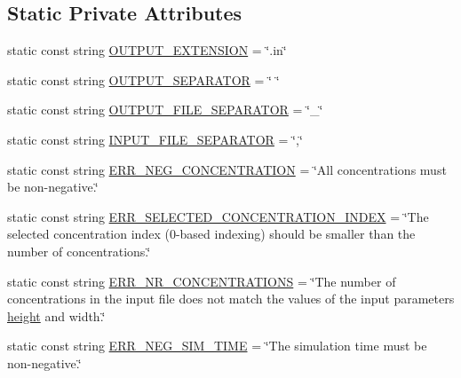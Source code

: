 \subsection*{Static Private Attributes}
\begin{DoxyCompactItemize}
\item 
static const string \hyperlink{classmultiscale_1_1video_1_1RectangularCsvToInputFilesConverter_a4a4df22dde1d303c2be63f6f12dd7a8d}{O\-U\-T\-P\-U\-T\-\_\-\-E\-X\-T\-E\-N\-S\-I\-O\-N} = \char`\"{}.in\char`\"{}
\item 
static const string \hyperlink{classmultiscale_1_1video_1_1RectangularCsvToInputFilesConverter_a8bc759087441c9d9ec210d30e193cf8a}{O\-U\-T\-P\-U\-T\-\_\-\-S\-E\-P\-A\-R\-A\-T\-O\-R} = \char`\"{} \char`\"{}
\item 
static const string \hyperlink{classmultiscale_1_1video_1_1RectangularCsvToInputFilesConverter_a814eefb31383af30a2f79f7518dc9bf8}{O\-U\-T\-P\-U\-T\-\_\-\-F\-I\-L\-E\-\_\-\-S\-E\-P\-A\-R\-A\-T\-O\-R} = \char`\"{}\-\_\-\char`\"{}
\item 
static const string \hyperlink{classmultiscale_1_1video_1_1RectangularCsvToInputFilesConverter_a5477635fa0cd7b53fe2bb3a7ae28d2e5}{I\-N\-P\-U\-T\-\_\-\-F\-I\-L\-E\-\_\-\-S\-E\-P\-A\-R\-A\-T\-O\-R} = \char`\"{},\char`\"{}
\item 
static const string \hyperlink{classmultiscale_1_1video_1_1RectangularCsvToInputFilesConverter_aec1bb7ad451ff5403d03d5519215efa5}{E\-R\-R\-\_\-\-N\-E\-G\-\_\-\-C\-O\-N\-C\-E\-N\-T\-R\-A\-T\-I\-O\-N} = \char`\"{}All concentrations must be non-\/negative.\char`\"{}
\item 
static const string \hyperlink{classmultiscale_1_1video_1_1RectangularCsvToInputFilesConverter_af69a7fbe0f633ee22a691089345216c3}{E\-R\-R\-\_\-\-S\-E\-L\-E\-C\-T\-E\-D\-\_\-\-C\-O\-N\-C\-E\-N\-T\-R\-A\-T\-I\-O\-N\-\_\-\-I\-N\-D\-E\-X} = \char`\"{}The selected concentration index (0-\/based indexing) should be smaller than the number of concentrations.\char`\"{}
\item 
static const string \hyperlink{classmultiscale_1_1video_1_1RectangularCsvToInputFilesConverter_a537517f861e68fc2df30dcb13c3b9a5d}{E\-R\-R\-\_\-\-N\-R\-\_\-\-C\-O\-N\-C\-E\-N\-T\-R\-A\-T\-I\-O\-N\-S} = \char`\"{}The number of concentrations in the input file does not match the values of the input parameters \hyperlink{classmultiscale_1_1video_1_1RectangularCsvToInputFilesConverter_a766bc7eea1c602f46a4a6c0948464c8a}{height} and width.\char`\"{}
\item 
static const string \hyperlink{classmultiscale_1_1video_1_1RectangularCsvToInputFilesConverter_ae1971c14899e0fdd7523271de0268924}{E\-R\-R\-\_\-\-N\-E\-G\-\_\-\-S\-I\-M\-\_\-\-T\-I\-M\-E} = \char`\"{}The simulation time must be non-\/negative.\char`\"{}

\end{DoxyCompactItemize}
